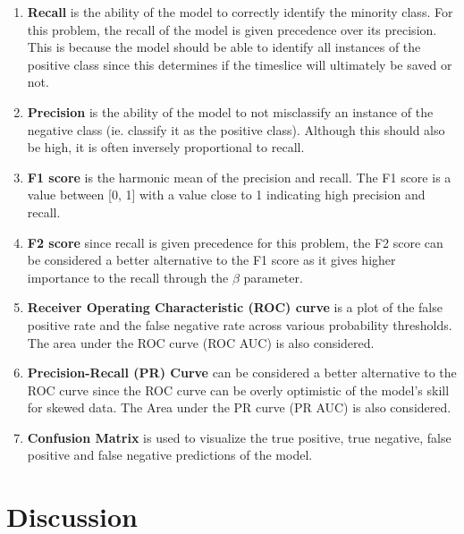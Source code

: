 \begin{enumerate}
\item \textbf{Recall} is the ability of the model to correctly
  identify the minority class. For this problem, the recall of the
  model is given precedence over its precision. This is because the
  model should be able to identify all instances of the positive class
  since this determines if the timeslice will ultimately be saved or
  not.
\item \textbf{Precision} is the ability of the model to not
  misclassify an instance of the negative class (ie. classify it as
  the positive class). Although this should also be high, it is often
  inversely proportional to recall.
\item \textbf{F1 score} is the harmonic mean of the precision and
  recall. The F1 score is a value between [0, 1] with a value close to
  1 indicating high precision and recall.
\item \textbf{F2 score} since recall is given precedence for this
  problem, the F2 score can be considered a better alternative to the
  F1 score as it gives higher importance to the recall through the
  $\beta$ parameter.
\item \textbf{Receiver Operating Characteristic (ROC) curve} is a plot
  of the false positive rate and the false negative rate across
  various probability thresholds. The area under the ROC curve (ROC
  AUC) is also considered.
\item \textbf{Precision-Recall (PR) Curve} can be considered a better
  alternative to the ROC curve since the ROC curve can be overly
  optimistic of the model's skill for skewed data. The Area under the
  PR curve (PR AUC) is also considered.
\item \textbf{Confusion Matrix} is used to visualize the true
  positive, true negative, false positive and false negative
  predictions of the model.
\end{enumerate}

\section{Discussion}
\label{sec:pm-disc}

